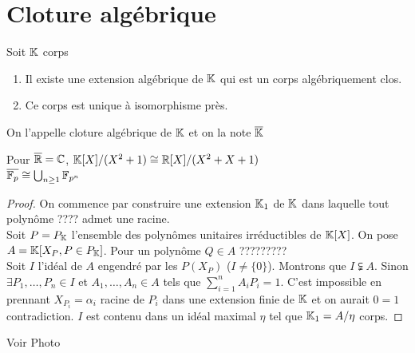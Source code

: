 \documentclass[]{report}
\begin{document}
    \section{Cloture algébrique}

    \begin{tm}{}{}
        Soit $\mathbb{K}$ corps
        \begin{enumerate}
            \item Il existe une extension algébrique de $\mathbb{K}$ qui est un corps algébriquement clos.
            \item Ce corps est unique à isomorphisme près.
        \end{enumerate}
        On l'appelle cloture algébrique de $\mathbb{K}$ et on la note $\overline{\mathbb{K}}$
    \end{tm}

    \begin{ex}{}{}
        Pour $\overline{\mathbb{R}}=\mathbb{C}$, $\mathbb{K}[X]/(X^2+1)\cong \mathbb{R}[X]/(X^2+X+1)$\\
        $\overline{\mathbb{F}_p}\cong\bigcup_{n\ge 1}\mathbb{F}_{p^n}$
    \end{ex}

    \begin{proof}
        On commence par construire une extension $\mathbb{K}_1$ de $\mathbb{K}$ dans laquelle tout polynôme ???? admet une racine.\\
        Soit $P=P_{\mathbb{K}}$ l'ensemble des polynômes unitaires irréductibles de $\mathbb{K}[X]$. On pose $A=\mathbb{K}[X_P,P\in P_{\mathbb{K}}]$. Pour un polynôme $Q\in A$ ?????????\\
        Soit $I$ l'idéal de $A$ engendré par les $P(X_P)$ ($I\neq\{0\}$). Montrons que $I\subsetneqq A$. Sinon $\exists P_1,\ldots,P_n\in I$ et $A_1,\ldots,A_n \in A$ tels que $\sum_{i=1}^{n}A_i P_i=1$. C'est impossible en prennant $X_{P_i}=\alpha_i$ racine de $P_i$ dans une extension finie de $\mathbb{K}$ et on aurait $0=1$ contradiction. $I$ est contenu dans un idéal maximal $\eta$ tel que $\mathbb{K}_1=A/\eta$ corps.
    \end{proof}

    \begin{lm}{}{}
        Voir Photo
    \end{lm}
\end{document}
